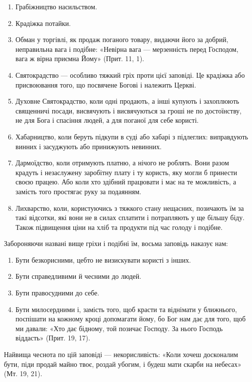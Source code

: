 \documentclass[main.tex]{subfiles}
\begin{document}
\begin{enumerate}
    \item Грабіжництво насильством.
    \item Крадіжка потайки.
    \item Обман у торгівлі, як продаж поганого товару, видаючи його за добрий, неправильна вага і подібне: «Невірна вага — мерзенність перед Господом, вага ж вірна приємна Йому» (Прит. 11, 1).
    \item Святокрадство — особливо тяжкий гріх проти цієї заповіді. Це крадіжка або присвоювання того, що посвячене Богові і належить Церкві.
    \item Духовне Святокрадство, коли одні продають, а інші купують і захоплюють священничі посади, висвячують і висвячуються за гроші не по достоїнству, не для Бога і спасіння людей, а для поганої для себе користі.
    \item Хабарництво, коли беруть підкупи в суді або хабарі з підлеглих: виправдують винних і засуджують або принижують невинних.
    \item Дармоїдство, коли отримують платню, а нічого не роблять. Вони разом крадуть і незаслужену заробітну плату і ту користь, яку могли б принести своєю працею. Або коли хто здібний працювати і має на те можливість, а замість того простягає руку за подаянням.
    \item Лихварство, коли, користуючись з тяжкого стану нещасних, позичають їм за такі відсотки, які вони не в силах сплатити і потрапляють у ще більшу біду. Також підвищення ціни на хліб та продукти під час голоду і подібне.
\end{enumerate}

Забороняючи названі вище гріхи і подібні їм, восьма заповідь наказує нам:

\begin{enumerate}
    \item Бути безкорисними, цебто не визискувати користі з інших.
    \item Бути справедливими й чесними до людей.
    \item Бути правосудними до себе.
    \item Бути милосердними і, замість того, щоб красти та віднімати у ближнього, поспішати на кожному кроці допомагати йому, бо Бог нам дає для того, щоб ми давали: «Хто дає бідному, той позичає Господу. За нього Господь віддасть» (Прит. 19, 17).
\end{enumerate}

Найвища чеснота по цій заповіді — некорисливість: «Коли хочеш досконалим бути, піди продай майно твоє, роздай убогим, і будеш мати скарби на небесах» (Мт. 19, 21).
\end{document}
